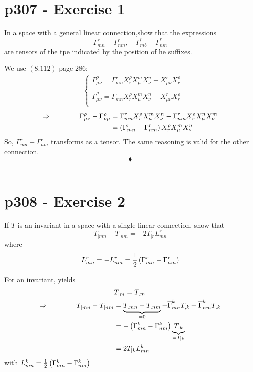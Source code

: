 \section{p307 - Exercise 1}
\begin{tcolorbox}
In a space with a general linear connection,show that the expressions
$$\Gamma^r_{mn}- \Gamma^r_{nm}, \quad \overline{\Gamma}^r_{mb}- \overline{\Gamma}^r_{nm}$$ are tensors of the tpe indicated by the position of he suffixes.
\end{tcolorbox}
 We use $\mathbf{(8.112)}$ page $286$:
 \begin{align*}
 &\left\{\begin{array}{l}
 \Gamma^{\rho}_{\mu\nu} = \Gamma^{r}_{mn} X^{\rho}_r X^m_{\mu} X^n_{\nu} + X^r_{\mu \nu} X^{\rho}_r\\\\
 \overline{\Gamma}^{\rho}_{\mu\nu} = \overline{\Gamma}_{mn} X^{\rho}_r X^m_{\mu} X^n_{\nu} + X^r_{\mu \nu} X^{\rho}_r\\
 \end{array}\right.
 \end{align*}
 \begin{align*}
 \Rightarrow\quad\quad\quad\quad \Gamma^{\rho}_{\mu\nu} -\Gamma^{\rho}_{\nu\mu}&=\Gamma^{r}_{mn} X^{\rho}_r X^m_{\mu} X^n_{\nu}-\Gamma^{r}_{nm} X^{\rho}_r X^n_{\mu} X^m_{\nu}\\
 &= \left(\Gamma^{r}_{mn}-\Gamma^{r}_{nm}\right)X^{\rho}_r X^m_{\mu} X^n_{\nu}
 \end{align*}
 So, $\Gamma^{r}_{mn}-\Gamma^{r}_{nm}$ transforms as a tensor. The same reasoning is valid for the other connection.
$$\blacklozenge$$\\
\newpage

\section{p308 - Exercise 2}
\begin{tcolorbox}
 If $T$ is an invariant in a space with a single linear connection, show that
 $$ T_{|mn} - T_{|nm} = -2 T_{|r} L^r_{mn}$$
 where 
 $$ L^r_{mn} = -L^r_{nm} = \frac{1}{2}\left(\Gamma^r_{mn} - \Gamma^r_{nm}\right)$$
\end{tcolorbox}
For an invariant, yields
\begin{align*}
&T_{|m} = T_{,m}\\
\Rightarrow\quad\quad\quad\quad T_{|mn}-T_{|nm} &= \underbrace{T_{,mn}-T_{,nm}}_{=0} -\overline{\Gamma}^k_{mn}T_{,k} + \overline{\Gamma}^k_{nm}T_{,k} \\
&= -\left(\Gamma^k_{mn}- \Gamma^k_{nm} \right) \underbrace{T_{,k}}_{= T_{|k}}\\
&= 2T_{|k}L^k_{mn}
\end{align*}
with $ L^k_{mn} = \frac{1}{2}\left(\Gamma^k_{mn}- \Gamma^k_{nm} \right) $

